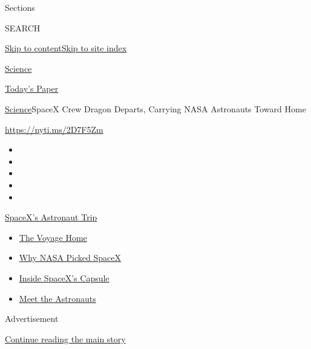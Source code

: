 Sections

SEARCH

\protect\hyperlink{site-content}{Skip to
content}\protect\hyperlink{site-index}{Skip to site index}

\href{https://www.nytimes.com/section/science}{Science}

\href{https://myaccount.nytimes.com/auth/login?response_type=cookie\&client_id=vi}{}

\href{https://www.nytimes.com/section/todayspaper}{Today's Paper}

\href{/section/science}{Science}\textbar{}SpaceX Crew Dragon Departs,
Carrying NASA Astronauts Toward Home

\url{https://nyti.ms/2D7F5Zm}

\begin{itemize}
\item
\item
\item
\item
\item
\end{itemize}

\href{https://www.nytimes.com/2020/08/01/science/nasa-spacex-astronauts.html?action=click\&pgtype=Article\&state=default\&region=TOP_BANNER\&context=storylines_menu}{SpaceX's
Astronaut Trip}

\begin{itemize}
\tightlist
\item
  \href{https://www.nytimes.com/2020/08/01/science/nasa-spacex-astronauts.html?action=click\&pgtype=Article\&state=default\&region=TOP_BANNER\&context=storylines_menu}{The
  Voyage Home}
\item
  \href{https://www.nytimes.com/2020/05/26/science/spacex-launch-nasa.html?action=click\&pgtype=Article\&state=default\&region=TOP_BANNER\&context=storylines_menu}{Why
  NASA Picked SpaceX}
\item
  \href{https://www.nytimes.com/interactive/2020/05/26/science/spacex-nasa.html?action=click\&pgtype=Article\&state=default\&region=TOP_BANNER\&context=storylines_menu}{Inside
  SpaceX's Capsule}
\item
  \href{https://www.nytimes.com/2020/05/27/science/bob-behnken-doug-hurley.html?action=click\&pgtype=Article\&state=default\&region=TOP_BANNER\&context=storylines_menu}{Meet
  the Astronauts}
\end{itemize}

Advertisement

\protect\hyperlink{after-top}{Continue reading the main story}


